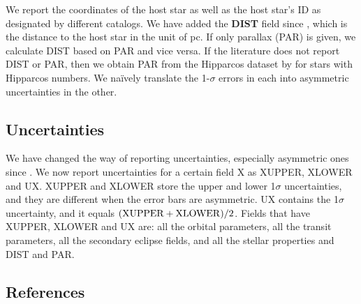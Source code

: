 \documentclass[11pt,preprint]{aastex}
\begin{document}
\begin{CJK*}{UTF8}{gbsn}
We report the coordinates of the host star as well as the host star's
ID as designated by different catalogs.  We have added the {\bf DIST} field since
\cite{Wright2011}, which is the distance to the host star in the unit
of pc. If only parallax (PAR) is given, we calculate DIST based on PAR
and vice versa. If the literature does not report DIST or PAR, then we
obtain PAR from the Hipparcos dataset by \cite{van Leeuwen2009} for
stars with Hipparcos numbers. We na\"ively translate the 1-$\sigma$ errors in each into asymmetric
uncertainties in the other.

\subsection{Uncertainties}\label{sec:unc}

We have changed the way of reporting uncertainties, especially
asymmetric ones since \cite{Wright2011}. We now report
uncertainties for a certain field X as XUPPER, XLOWER and UX. XUPPER
and XLOWER store the upper and lower 1$\sigma$ uncertainties, and they
are different when the error bars are asymmetric. UX contains the
1$\sigma$ uncertainty, and it equals $({\rm XUPPER+XLOWER})/2$. Fields
that have XUPPER, XLOWER and UX are: all the orbital parameters, all
the transit parameters, all the secondary eclipse fields, and all the stellar
properties and DIST and PAR.

\subsection{References}\label{sec:ref}


\end{CJK*}
\end{document}
